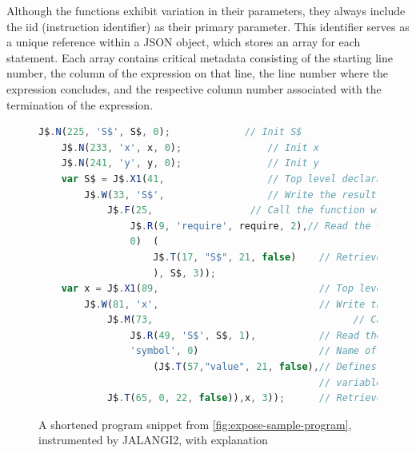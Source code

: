 Although the functions exhibit variation in their parameters, they always include the iid (instruction identifier) as their primary parameter. This identifier serves as a unique reference within a JSON object, which stores an array for each statement. Each array contains critical metadata consisting of the starting line number, the column of the expression on that line, the line number where the expression concludes, and the respective column number associated with the termination of the expression.



\begin{figure}[ht]

 \lstset{basicstyle=\footnotesize}
    \begin{lstlisting}[language=JavaScript, gobble=4]
    J$.N(225, 'S$', S$, 0);             // Init S$
    J$.N(233, 'x', x, 0);               // Init x
    J$.N(241, 'y', y, 0);               // Init y
    var S$ = J$.X1(41,                  // Top level declaration
        J$.W(33, 'S$',                  // Write the result of the following:
            J$.F(25,                 // Call the function with the follwing parameter:
                J$.R(9, 'require', require, 2),// Read the value of "require"
                0)  (
                    J$.T(17, "S$", 21, false)    // Retrieve the value of the S$ object
                    ), S$, 3));
    var x = J$.X1(89,                            // Top level declaration
        J$.W(81, 'x',                            // Write the result of the following:
            J$.M(73,                                   // Call the function of:
                J$.R(49, 'S$', S$, 1),           // Read the value of the expression S$
                'symbol', 0)                     // Name of the called function
                    (J$.T(57,"value", 21, false),// Defines the value of the 
                                                 // variable as literal
            J$.T(65, 0, 22, false)),x, 3));      // Retrieve the value "0"


    \end{lstlisting}
    \caption{A shortened program snippet from \autoref{fig:expose-sample-program}, instrumented by JALANGI2, with explanation}
    \label{fig:code-snippet}
\end{figure}

